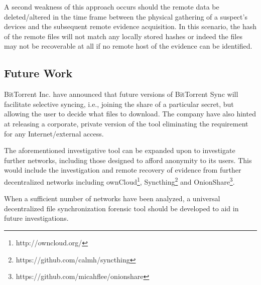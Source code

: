 \documentclass{jdfsl}
\begin{document}
A second weakness of this approach occurs should the remote data be deleted/altered in the time frame between the physical gathering of a suspect's devices and the subsequent remote evidence acquisition. In this scenario, the hash of the remote files will not match any locally stored hashes or indeed the files may not be recoverable at all if no remote host of the evidence can be identified.\\

\subsection{Future Work}
\label{futurework}

BitTorrent Inc. have announced that future versions of BitTorrent Sync will facilitate selective syncing, i.e., joining the share of a particular secret, but allowing the user to decide what files to download. The company have also hinted at releasing a corporate, private version of the tool eliminating the requirement for any Internet/external access. 

The aforementioned investigative tool can be expanded upon to investigate further networks, including those designed to afford anonymity to its users. This would include the investigation and remote recovery of evidence from further decentralized networks including ownCloud\footnote{http://owncloud.org/}, Syncthing\footnote{https://github.com/calmh/syncthing} and OnionShare\footnote{https://github.com/micahflee/onionshare}. 

When a sufficient number of networks have been analyzed, a universal decentralized file synchronization forensic tool should be developed to aid in future investigations.


\newpage


\begin{flushleft}

\end{flushleft}
\end{document}
